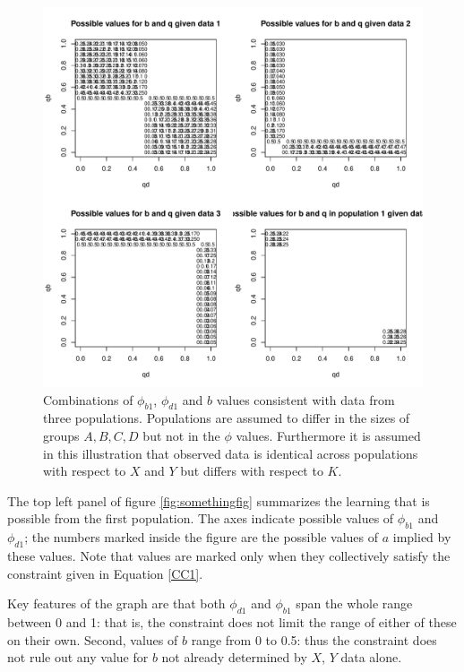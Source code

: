 \documentclass[12pt,]{book}
\begin{document}
\begin{figure}

{\centering \includegraphics{ii_files/figure-latex/unnamed-chunk-91-1} 

}

\caption{\label{fig:somethingfig} Combinations of $\phi_{b1}$, $\phi_{d1}$ and $b$ values consistent with data from three populations. Populations are assumed to differ in the sizes of groups $A,B,C,D$ but not in the $\phi$ values. Furthermore it is assumed in this illustration that observed data is identical across populations with respect to $X$ and $Y$ but differs with respect to $K$.}\label{fig:unnamed-chunk-91}
\end{figure}

The top left panel of figure \ref{fig:somethingfig} summarizes the learning that is possible from the first population. The axes indicate possible values of \(\phi_{b1}\) and \(\phi_{d1}\); the numbers marked inside the figure are the possible values of \(a\) implied by these values. Note that values are marked only when they collectively satisfy the constraint given in Equation \ref{CC1}.

Key features of the graph are that both \(\phi_{d1}\) and \(\phi_{b1}\) span the whole range between 0 and 1: that is, the constraint does not limit the range of either of these on their own. Second, values of \(b\) range from 0 to 0.5: thus the constraint does not rule out any value for \(b\) not already determined by \(X\), \(Y\) data alone.
\end{document}
